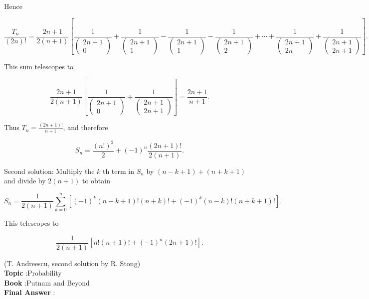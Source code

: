 \documentclass[10pt]{article}
\begin{document}
Hence

$$
\frac{T_{n}}{(2 n) !}=\frac{2 n+1}{2(n+1)}\left[\frac{1}{\left(\begin{array}{c}
2 n+1 \\
0
\end{array}\right)}+\frac{1}{\left(\begin{array}{c}
2 n+1 \\
1
\end{array}\right)}-\frac{1}{\left(\begin{array}{c}
2 n+1 \\
1
\end{array}\right)}-\frac{1}{\left(\begin{array}{c}
2 n+1 \\
2
\end{array}\right)}+\cdots+\frac{1}{\left(\begin{array}{c}
2 n+1 \\
2 n
\end{array}\right)}+\frac{1}{\left(\begin{array}{c}
2 n+1 \\
2 n+1
\end{array}\right)}\right] .
$$

This sum telescopes to

$$
\frac{2 n+1}{2(n+1)}\left[\frac{1}{\left(\begin{array}{c}
2 n+1 \\
0
\end{array}\right)}+\frac{1}{\left(\begin{array}{c}
2 n+1 \\
2 n+1
\end{array}\right)}\right]=\frac{2 n+1}{n+1} .
$$

Thus $T_{n}=\frac{(2 n+1) !}{n+1}$, and therefore

$$
S_{n}=\frac{(n !)^{2}}{2}+(-1)^{n} \frac{(2 n+1) !}{2(n+1)} .
$$

Second solution: Multiply the $k$ th term in $S_{n}$ by $(n-k+1)+(n+k+1)$ and divide by $2(n+1)$ to obtain

$$
S_{n}=\frac{1}{2(n+1)} \sum_{k=0}^{n}\left[(-1)^{k}(n-k+1) !(n+k) !+(-1)^{k}(n-k) !(n+k+1) !\right] .
$$

This telescopes to

$$
\frac{1}{2(n+1)}\left[n !(n+1) !+(-1)^{n}(2 n+1) !\right] .
$$

(T. Andreescu, second solution by R. Stong)
\\
\textbf{Topic} :Probability\\
\textbf{Book} :Putnam and Beyond\\
\textbf{Final Answer} :\\
\end{document}
